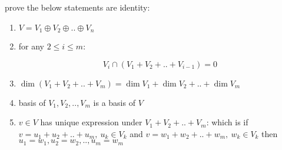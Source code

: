 \begin{exercise}
    prove the below statements are identity:

    \begin{enumerate}
        \item $V = V_1 \oplus V_2 \oplus .. \oplus V_n $

        \item for any $2 \le i \le m$:
        
        \[
            V_i \cap (V_1 + V_2 + .. + V_{i-1}) = 0
        \]

        \item $\dim (V_1 + V_2 + .. + V_m) = \dim V_1 + \dim V_2 + .. + \dim V_m$

        \item basis of $V_1, V_2, .. ,V_m$ is a basis of $V$

        \item $v \in V$ has unique expression under $V_1 + V_2 + .. + V_m$: which is
        if $v = u_1 + u_2 + .. + u_m,\: u_k \in V_k$ and $v = w_1 + w_2 + .. + w_m,\: w_k \in V_k$  then
        $u_1 = w_1, u_2 = w_2, .. , u_m = w_m$

    \end{enumerate}
\end{exercise}

